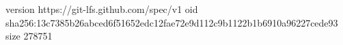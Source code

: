 version https://git-lfs.github.com/spec/v1
oid sha256:13c7385b26abced6f51652edc12fae72e9d112c9b1122b1b6910a96227cede93
size 278751
